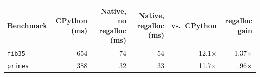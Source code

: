 \begin{tabular}{@{}lrrrrr@{}}\toprule
\textbf{Benchmark} & \textbf{CPython (ms)} & \textbf{Native, no regalloc (ms)} & \textbf{Native, regalloc (ms)} & \textbf{vs.\ CPython} & \textbf{regalloc gain}\\ \midrule
\texttt{fib35} & 654 & 74 & 54 & 12.1$\times$ & 1.37$\times$\\
\texttt{primes} & 388 & 32 & 33 & 11.7$\times$ & .96$\times$\\
\bottomrule
\end{tabular}
